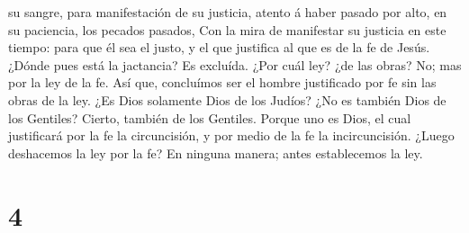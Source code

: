 su sangre, para manifestación de su justicia, atento á haber pasado por
alto, en su paciencia, los pecados pasados,  Con la mira
de manifestar su justicia en este tiempo: para que él sea el justo, y el
que justifica al que es de la fe de Jesús.  ¿Dónde pues
está la jactancia? Es excluída. ¿Por cuál ley? ¿de las obras? No; mas
por la ley de la fe.  Así que, concluímos ser el hombre
justificado por fe sin las obras de la ley.  ¿Es Dios
solamente Dios de los Judíos? ¿No es también Dios de los Gentiles?
Cierto, también de los Gentiles.  Porque uno es Dios, el
cual justificará por la fe la circuncisión, y por medio de la fe la
incircuncisión.  ¿Luego deshacemos la ley por la fe? En
ninguna manera; antes establecemos la ley.

\hypertarget{section-3}{%
\section{4}\label{section-3}}

